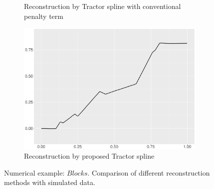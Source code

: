 \begin{figure}
\begin{subfigure}{0.45\textwidth}
    \caption{Reconstruction by Tractor spline with conventional penalty term}
    \end{subfigure}
    \begin{subfigure}{0.45\textwidth}
    \centering
    \includegraphics[width=\linewidth,height=0.45\textwidth]{Chapters/02TractorSplineTheory/plot/ggplot/ggBlocksTractor.pdf}
    \caption{Reconstruction by proposed Tractor spline}
    \end{subfigure}
\caption{Numerical example: $\textit{Blocks}$. Comparison of different reconstruction methods with simulated data.}\label{num1}
 \end{figure}

%


